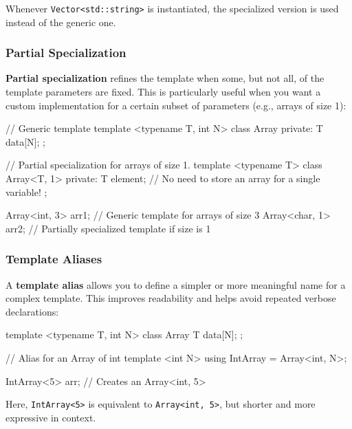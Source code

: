 Whenever \texttt{Vector<std::string>} is instantiated, the specialized version is used instead of the generic one.

\subsubsection{Partial Specialization}

\textbf{Partial specialization} refines the template when some, but not all, of the template parameters are fixed. This is particularly useful when you want a custom implementation for a certain subset of parameters (e.g., arrays of size 1):

\begin{codeblock}[language=C++]
// Generic template
template <typename T, int N>
class Array {
private:
    T data[N];
};

// Partial specialization for arrays of size 1.
template <typename T>
class Array<T, 1> {
private:
    T element; // No need to store an array for a single variable!
};

Array<int, 3> arr1;  // Generic template for arrays of size 3
Array<char, 1> arr2; // Partially specialized template if size is 1
\end{codeblock}



\subsubsection{Template Aliases}

A \textbf{template alias} allows you to define a simpler or more meaningful name for a complex template. This improves readability and helps avoid repeated verbose declarations:

\begin{codeblock}[language=C++, numbers=none]
template <typename T, int N>
class Array {
    T data[N];
};

// Alias for an Array of int
template <int N>
using IntArray = Array<int, N>;

IntArray<5> arr; // Creates an Array<int, 5>
\end{codeblock}

Here, \texttt{IntArray<5>} is equivalent to \texttt{Array<int, 5>}, but shorter and more expressive in context.


